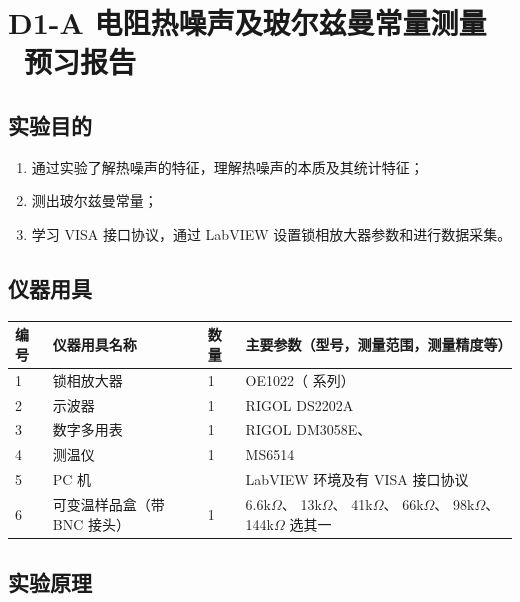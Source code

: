 \documentclass[dvipsnames, svgnames,a4paper,11pt]{article}
\begin{document}
\clearpage
\tableofcontents
\clearpage

\setcounter{section}{0}
\section{D1-A \quad 电阻热噪声及玻尔兹曼常量测量 \ 预习报告}
	
\subsection{实验目的}
\begin{enumerate}
	\item 通过实验了解热噪声的特征，理解热噪声的本质及其统计特征；
	\item 测出玻尔兹曼常量；
	\item 学习 VISA 接口协议，通过 LabVIEW 设置锁相放大器参数和进行数据采集。
	
\end{enumerate}

\subsection{仪器用具}
\begin{table}[htbp]
	\centering
	\renewcommand\arraystretch{1.6}
	\begin{tabular}{p{}|p{}|p{}|p{}}
	\hline
	编号& 仪器用具名称 & 数量 &  主要参数（型号，测量范围，测量精度等） \\
	\hline
	1	&	锁相放大器 	&1 	& OE1022（ 系列）\\

	2	&	示波器 	&	1 	& RIGOL DS2202A		 \\
	
	3	&	数字多用表 & 1 &	RIGOL DM3058E、 	\\
	
	4	&	测温仪	&1 & MS6514	\\
	
	5	&	PC 机	&	 & LabVIEW 环境及有 VISA 接口协议	\\

	6	&	可变温样品盒（带BNC 接头）&	1	&	6.6k$\Omega$、 13k$\Omega$、 41k$\Omega$、 66k$\Omega$、 98k$\Omega$、144k$\Omega$	选其一	\\
	\hline
\end{tabular}
\end{table}


\subsection{实验原理}
\end{document}
